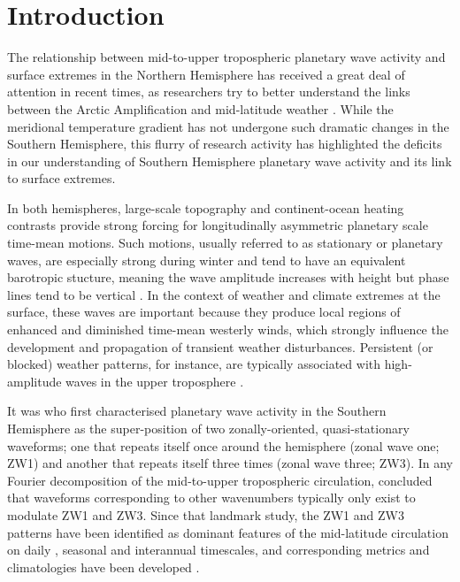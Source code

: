 \section{Introduction}\label{s:introduction}

The relationship between mid-to-upper tropospheric planetary wave activity and surface extremes in the Northern Hemisphere has received a great deal of attention in recent times, as researchers try to better understand the links between the Arctic Amplification and mid-latitude weather \citep[e.g.][]{Cohen2014,Screen2014}. While the meridional temperature gradient has not undergone such dramatic changes in the Southern Hemisphere, this flurry of research activity has highlighted the deficits in our understanding of Southern Hemisphere planetary wave activity and its link to surface extremes. 

In both hemispheres, large-scale topography and continent-ocean heating contrasts provide strong forcing for longitudinally asymmetric planetary scale time-mean motions. Such motions, usually referred to as stationary or planetary waves, are especially strong during winter and tend to have an equivalent barotropic stucture, meaning the wave amplitude increases with height but phase lines tend to be vertical \citep{Holton2013}. In the context of weather and climate extremes at the surface, these waves are important because they produce local regions of enhanced and diminished time-mean westerly winds, which strongly influence the development and propagation of transient weather disturbances. Persistent (or blocked) weather patterns, for instance, are typically associated with high-amplitude waves in the upper troposphere \citep[e.g.][]{Trenberth1985,Renwick2005}.

It was \citet{vanLoon1972} who first characterised planetary wave activity in the Southern Hemisphere as the super-position of two zonally-oriented, quasi-stationary waveforms; one that repeats itself once around the hemisphere (zonal wave one; ZW1) and another that repeats itself three times (zonal wave three; ZW3). In any Fourier decomposition of the mid-to-upper tropospheric circulation, \citet{vanLoon1972} concluded that waveforms corresponding to other wavenumbers typically only exist to modulate ZW1 and ZW3. Since that landmark study, the ZW1 and ZW3 patterns have been identified as dominant features of the mid-latitude circulation on daily \citep[e.g.][]{Kidson1988}, seasonal \citep[e.g.][]{Mo1985} and interannual \citep[e.g.][]{Karoly1989} timescales, and corresponding metrics and climatologies have been developed \citep{Raphael2004,Hobbs2007}.

